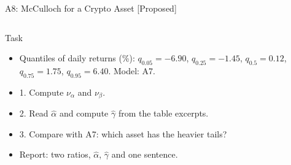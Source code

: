 \begin{frame}{A8: McCulloch for a Crypto Asset [Proposed]}
\propsub
\itemsize{\scriptsize}
\begin{columns}[T]
\begin{column}{\taskw}
\begin{block}{Task}
\begin{itemize}
    \item Quantiles of daily returns (\%): $q_{0.05} = -6.90$, $q_{0.25} = -1.45$, $q_{0.5} = 0.12$, $q_{0.75} = 1.75$, $q_{0.95} = 6.40$. Model: A7.
    \item 1. Compute $\nu_\alpha$ and $\nu_\beta$.
    \item 2. Read $\hat\alpha$ and compute $\hat\gamma$ from the table excerpts.
    \item 3. Compare with A7: which asset has the heavier tails?
    \item Report: two ratios, $\hat\alpha$, $\hat\gamma$ and one sentence.
\end{itemize}
\end{block}
\end{column}
\begin{column}{\solw}
\end{column}
\end{columns}
\end{frame}

